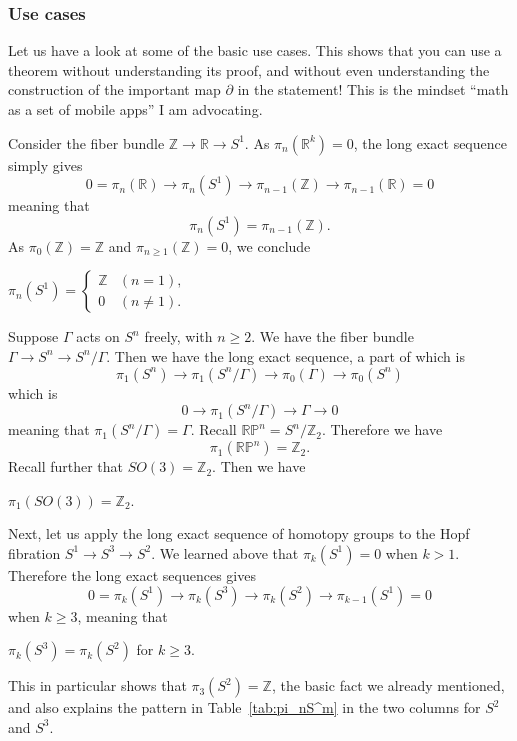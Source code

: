 \documentclass[12pt]{article}
\numberwithin{equation}{section}
\numberwithin{figure}{section}
\theoremstyle{remark}
\def\bR{\mathbb{R}}
\def\bZ{\mathbb{Z}}
\def\RP{\mathbb{RP}}
\begin{document}
\subsubsection{Use cases}
Let us have a look at some of the basic use cases. 
This shows that you can use a theorem without understanding its proof,
and without even understanding the construction of the important map $\partial$
in the statement!
This is the mindset ``math as a set of mobile apps'' I am advocating.

Consider the fiber bundle $\bZ\to \bR \to S^1$.
As $\pi_n(\bR^k)=0$, the long exact sequence simply gives
\begin{equation}
0=\pi_n(\bR)\to \pi_n(S^1)\to \pi_{n-1}(\bZ)\to \pi_{n-1}(\bR)=0
\end{equation} meaning that \begin{equation}
  \pi_n(S^1)=\pi_{n-1}(\bZ).
\end{equation} As $\pi_0(\bZ)=\bZ$ and $\pi_{n\ge 1}(\bZ)=0$,
we conclude 
\begin{example}
$
  \pi_n(S^1)=\begin{cases}
    \bZ & (n=1), \\
    0 & (n\neq 1).
  \end{cases}
$
\end{example}

Suppose $\Gamma$ acts on $S^n$ freely, with $n\ge 2$. 
We have the fiber bundle $\Gamma\to S^n\to S^n/\Gamma$.
Then we have the long exact sequence, a part of which is \begin{equation}
  \pi_1(S^n) \to \pi_1(S^n/\Gamma)\to \pi_0(\Gamma) \to \pi_0(S^n)
\end{equation} which is \begin{equation}
   0 \to \pi_1(S^n/\Gamma) \to \Gamma\to 0
\end{equation} meaning that $\pi_1(S^n/\Gamma)=\Gamma$.
Recall $\RP^n=S^n/\bZ_2$. Therefore we have \begin{equation}
  \pi_1(\RP^n)=\bZ_2.
\end{equation}
Recall further that $SO(3)=\bZ_2$. Then we have 
\begin{example}
$  \pi_1(SO(3))=\bZ_2 $.
\end{example}

Next, let us apply the long exact sequence of homotopy groups to the Hopf fibration $S^1\to S^3\to S^2$.
We learned above that $\pi_k(S^1)=0$ when $k>1$.
Therefore the long exact sequences gives \begin{equation}
  0=\pi_{k}(S^1)\to \pi_{k}(S^3)\to \pi_k(S^2)\to \pi_{k-1}(S^1)=0
\end{equation} when $k\ge 3$, meaning that 
\begin{proposition}
$  \pi_k(S^3)=\pi_k(S^2)$ for $k\ge 3$.
\end{proposition}
This in particular shows that $\pi_3(S^2)=\bZ$, the basic fact we already mentioned,
and also explains the pattern in Table~\ref{tab:pi_nS^m}
in the two columns for $S^2$ and $S^3$.
\end{document}
